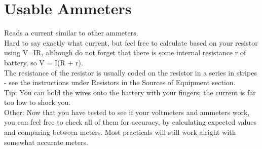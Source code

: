 \section{Usable Ammeters}
Reads a current similar to other ammeters. \\
Hard to say exactly what current, 
but feel free to calculate based on your resistor using V=IR, although do not
forget that there is some internal resistance r of battery, so V = I(R + r). \\
The resistance of the resistor is usually coded on the resistor in a series in stripes -
see the instructions under Resistors in the Sources of Equipment section.  \\
Tip: You can hold the wires onto the battery with your fingers; the current
is far too low to shock you.  \\
Other: Now that you have tested to see if your voltmeters and ammeters
work, you can feel free to check all of them for accuracy, by calculating expected
values and comparing between meters. Most practicals will still work alright
with somewhat accurate meters.
